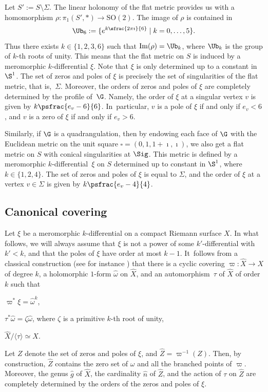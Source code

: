 Let $S':=S\setminus\Sigma$. The linear holonomy of the flat metric provides us with a homomorphism $\rho: \pi_1(S',*) \to \mathrm{SO}(2)$.
The image of $\rho$ is contained in
\[
\Ub_6:=\{e^{k\sfrac{2\pi\imath}{6}}\mid k=0,\dots,5\}.
\]
Thus there exists $k\in \{1,2,3,6\}$ such that $\mathrm{Im}(\rho)=\Ub_k$, where $\Ub_k$ is the group of $k$-th roots of unity.
This means that the flat metric on $S$ is induced by a meromorphic $k$-differential $\xi$.
Note that $\xi$ is only determined up to a constant in $\S^1$.
The set of zeros and poles of $\xi$ is precisely the set of singularities of the flat metric, that is,~$\Sigma$.
Moreover, the orders of zeros and poles of $\xi$ are completely determined by the profile of~$\G$.
Namely, the order of $\xi$ at a singular vertex $v$ is given by $k\psfrac{e_v-6}{6}$.
In~particular, $v$ is a pole of $\xi$ if and only if $e_v<6$, and $v$ is a zero of $\xi$ if and only if $e_v>6$.

Similarly, if $\G$ is a quadrangulation, then by endowing each face of $\G$ with the Euclidean metric on the unit square $\square=(0,1,1+\imath,\imath)$, we also get a flat metric on $S$ with conical singularities at $\Sig$. This metric is defined by a meromorphic $k$-differential~$\xi$ on $S$ determined up to constant in $\S^1$, where $k\in \{1,2,4\}$. The set of zeros and poles of $\xi$ is equal to $\Sigma$, and the order of $\xi$ at a vertex $v\in \Sigma$ is given by $k\psfrac{e_v-4}{4}$.

\subsection{Canonical covering}\label{sec:can:cov:kdiff}
Let $\xi$ be a meromorphic $k$-differential on a compact Riemann surface $X$. In what follows, we will always assume that $\xi$ is not a power of some $k'$-differential with $k'<k$, and that the poles of $\xi$ have order at most $k-1$. It~follows from a classical construction (see for instance \cite{EV92, BCGGM:kdiff, Ngu19}) that there is a cyclic covering $\varpi: \hat{X}\to X$ of degree $k$, a holomorphic $1$-form $\hat{\omega}$ on $\hat{X}$, and an automorphism~$\tau$ of $\hat{X}$ of order $k$ such that
\begin{enumeratea}
\item\label{enum:a}
$\varpi^*\xi=\hat{\omega}^k$,
\item\label{enum:b}
$\tau^*\hat{\omega}=\zeta\hat{\omega}$, where $\zeta$ is a primitive $k$-th root of unity,
\item\label{enum:c}
$\hat{X}/\langle \tau \rangle \simeq X$.
\end{enumeratea}
Let $Z$ denote the set of zeros and poles of $\xi$, and $\hat{Z}=\varpi^{-1}(Z)$. Then, by construction, $\hat{Z}$ contains the zero set of $\omega$ and all the branched points of $\varpi$.
Moreover, the genus $\hat{g}$ of $\hat{X}$, the cardinality $\hat{n}$ of $\hat{Z}$, and the action of $\tau$ on $\hat{Z}$ are completely determined by the orders of the zeros and poles of $\xi$.

